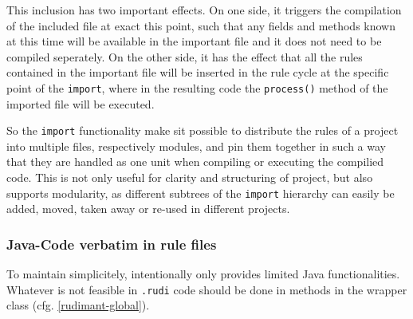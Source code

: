 This inclusion has two important effects. On one side, it triggers the compilation of the included file at exact this point, such that any fields and methods known at this time will be available in the important file and it does not need to be compiled seperately. On the other side, it has the effect that all the rules contained in the important file will be inserted in the rule cycle at the specific point of the \texttt{import}, where in the resulting code the \texttt{process()} method of the imported file will be executed.


So the \texttt{import} functionality make sit possible to distribute the rules of a project into multiple files, respectively modules, and pin them together in such a way that they are handled as one unit when compiling or executing the compilied code. This is not only useful for clarity and structuring of project, but also supports modularity, as different subtrees of the \texttt{import} hierarchy can easily be added, moved, taken away or re-used in different projects.

\subsubsection{Java-Code verbatim in rule files} \label{sec:rudi-verbatim}

%
To maintain simplicitely, \vonda intentionally only provides limited Java functionalities. Whatever is not feasible in \texttt{.rudi} code should be done in methods in the wrapper class (cfg. \ref{rudimant-global}).

